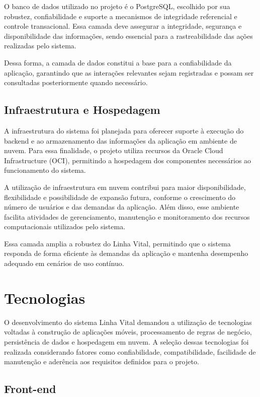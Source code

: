 O banco de dados utilizado no projeto é o PostgreSQL, escolhido por sua robustez, confiabilidade e suporte a mecanismos de integridade referencial e controle transacional. Essa camada deve assegurar a integridade, segurança e disponibilidade das informações, sendo essencial para a rastreabilidade das ações realizadas pelo sistema.

Dessa forma, a camada de dados constitui a base para a confiabilidade da aplicação, garantindo que as interações relevantes sejam registradas e possam ser consultadas posteriormente quando necessário.

\subsection{Infraestrutura e Hospedagem}

A infraestrutura do sistema foi planejada para oferecer suporte à execução do backend e ao armazenamento das informações da aplicação em ambiente de nuvem. Para essa finalidade, o projeto utiliza recursos da Oracle Cloud Infrastructure (OCI), permitindo a hospedagem dos componentes necessários ao funcionamento do sistema.

A utilização de infraestrutura em nuvem contribui para maior disponibilidade, flexibilidade e possibilidade de expansão futura, conforme o crescimento do número de usuários e das demandas da aplicação. Além disso, esse ambiente facilita atividades de gerenciamento, manutenção e monitoramento dos recursos computacionais utilizados pelo sistema.

Essa camada amplia a robustez do Linha Vital, permitindo que o sistema responda de forma eficiente às demandas da aplicação e mantenha desempenho adequado em cenários de uso contínuo.



\section{Tecnologias}

O desenvolvimento do sistema Linha Vital demandou a utilização de tecnologias voltadas à construção de aplicações móveis, processamento de regras de negócio, persistência de dados e hospedagem em nuvem. A seleção dessas tecnologias foi realizada considerando fatores como confiabilidade, compatibilidade, facilidade de manutenção e aderência aos requisitos definidos para o projeto.

\subsection{Front-end}

